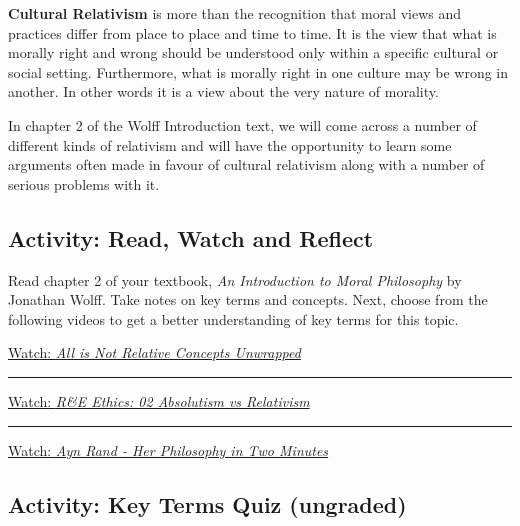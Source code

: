 \documentclass[
]{book}
\begin{document}
\textbf{Cultural Relativism} is more than the recognition that moral views and practices differ from place to place and time to time. It is the view that what is morally right and wrong should be understood only within a specific cultural or social setting. Furthermore, what is morally right in one culture may be wrong in another. In other words it is a view about the very nature of morality.

In chapter 2 of the Wolff Introduction text, we will come across a number of different kinds of relativism and will have the opportunity to learn some arguments often made in favour of cultural relativism along with a number of serious problems with it.

\hypertarget{activity-read-watch-and-reflect}{%
\subsection*{Activity: Read, Watch and Reflect}\label{activity-read-watch-and-reflect}}

\begin{reflect}
Read chapter 2 of your textbook, \emph{An Introduction to Moral Philosophy} by Jonathan Wolff. Take notes on key terms and concepts. Next, choose from the following videos to get a better understanding of key terms for this topic.

\href{https://www.youtube.com/watch?v=Z11v2nWsgGA}{Watch: \emph{All is Not Relative \textbar{} Concepts Unwrapped}}

\begin{center}\rule{0.5\linewidth}{0.5pt}\end{center}

\href{https://www.youtube.com/watch?v=DxhsYTlBNG8}{Watch: \emph{R\&E Ethics: 02 Absolutism vs Relativism}}

\begin{center}\rule{0.5\linewidth}{0.5pt}\end{center}

\href{https://www.youtube.com/watch?v=asery3UeBj4}{Watch: \emph{Ayn Rand - Her Philosophy in Two Minutes}}
\end{reflect}

\hypertarget{activity-key-terms-quiz-ungraded}{%
\subsection*{Activity: Key Terms Quiz (ungraded)}\label{activity-key-terms-quiz-ungraded}}
\end{document}
